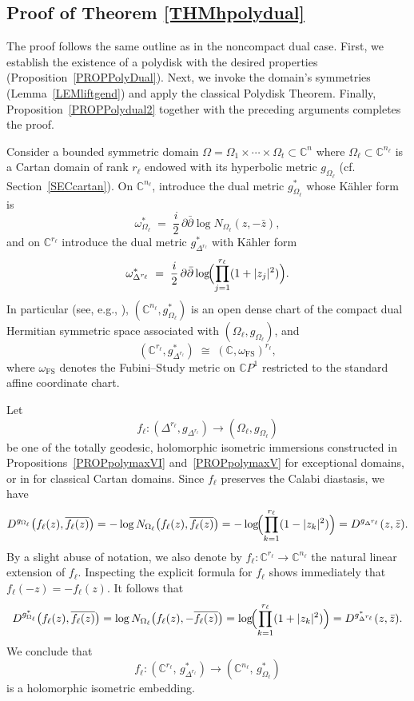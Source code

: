 \documentclass[reqno, 11pt]{amsart}
\newcommand{\C}{\mathbb{C}}
\newcommand{\W}{\Omega}
\begin{document}
\subsection{Proof of Theorem \ref{THMhpolydual}}
The proof follows the same outline as in the noncompact dual case.  First, we establish the existence of a polydisk with the desired properties (Proposition~\ref{PROPPolyDual}).  Next, we invoke the domain’s symmetries (Lemma~\ref{LEMliftgend}) and apply the classical Polydisk Theorem.  Finally, Proposition~\ref{PROPPolydual2} together with the preceding arguments completes the proof.

\vskip0.1cm

\noindent

Consider a bounded symmetric domain $\W=\W_1\times\cdots\times\W_t\subset\C^n$  where 
$\Omega_\ell\subset\C^{n_\ell}$ is a Cartan domain  of rank $r_{\ell}$ endowed with its hyperbolic metric $g_{\Omega_\ell}$ (cf.  Section~\ref{SECcartan}). On $\C^{n_\ell}$, introduce the dual metric $g_{\Omega_\ell}^*$ whose Kähler form is  
\[
\omega_{{\Omega_\ell}}^* \;=\; \frac{i}{2}\,\partial\bar\partial \log N_{\Omega_\ell}(z,-\bar z),
\]
and on $\C^{r_\ell}$ introduce the dual metric $g_{\Delta^{r_\ell}}^*$ with Kähler form  
\[
\omega_{{\Delta^{r_\ell}}}^* \;=\; \frac{i}{2}\,\partial\bar\partial \log\!\Bigl(\prod_{j=1}^{r_\ell} (1+|z_j|^2)\Bigr).
\]
In particular (see, e.g., \cite{MOSSAZEDDAS2022symplch}), $(\C^{n_\ell},g_{\Omega_\ell}^*)$ is an open dense chart of the compact dual Hermitian symmetric space associated with $(\Omega_\ell,g_{\Omega_\ell})$, and 
\[
(\C^{r_\ell},g_{\Delta^{r_\ell}}^*) \;\cong\; (\C,\omega_{\mathrm{FS}})^{r_\ell},
\]
where $\omega_{\mathrm{FS}}$ denotes the Fubini–Study metric on $\mathbb{C}P^1$ restricted to the standard affine coordinate chart. 

Let  
\begin{equation}\label{EQfdeltar}
f_\ell\colon (\Delta^{r_\ell},g_{\Delta^{r_\ell}}) \longrightarrow (\Omega_\ell,g_{\Omega_\ell})
\end{equation}
be one of the totally geodesic, holomorphic isometric immersions constructed in Propositions~\ref{PROPpolymaxVI} and~\ref{PROPpolymaxV} for exceptional domains, or in \cite[Sec.~2]{MOSSAZEDDA2022polch} for classical  Cartan domains. Since $f_\ell$ preserves the Calabi diastasis, we have
\[
D^{g_{\Omega_\ell}}\bigl(f_\ell(z),\overline{f_\ell(z)}\bigr)
=-\log N_{\Omega_\ell}\bigl(f_\ell(z),\overline{f_\ell(z)}\bigr)
=-\log\!\Bigl(\prod_{k=1}^{r_\ell}(1-|z_k|^2)\Bigr)
=D^{g_{\Delta^{r_\ell}}}(z,\bar z).
\]
By a slight abuse of notation, we also denote by $f_\ell\colon \C^{r_\ell}\to\C^{n_\ell}$ the natural linear extension of $f_\ell$. Inspecting the explicit formula for $f_\ell$ shows immediately that $f_\ell(-z)=-f_\ell(z)$. It follows that
\[
D^{g_{\Omega_\ell}^*}\bigl(f_\ell(z),\overline{f_\ell(z)}\bigr)
=\log N_{\Omega_\ell}\bigl(f_\ell(z),-\overline{f_\ell(z)}\bigr)
=\log\!\Bigl(\prod_{k=1}^{r_\ell}(1+|z_k|^2)\Bigr)
=D^{g_{\Delta^{r_\ell}}^*}(z,\bar z).
\]
We conclude that
\[
f_\ell\colon (\C^{r_\ell},\,g_{\Delta^{r_\ell}}^*) \longrightarrow (\C^{n_\ell},\,g_{\Omega_\ell}^*)
\]
is a holomorphic isometric embedding.
\end{document}
